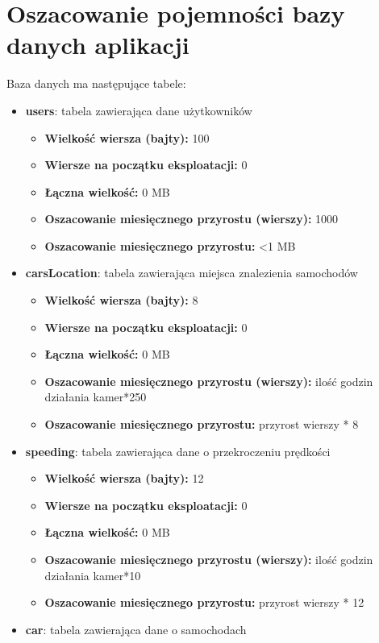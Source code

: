 \documentclass[12pt]{article}
\begin{document}
\section{Oszacowanie pojemności bazy danych aplikacji}
Baza danych ma następujące tabele:
\begin{itemize}
\item \textbf{users}: tabela zawierająca dane użytkowników 
	\begin{itemize}
		\item \textbf{Wielkość wiersza (bajty):} 100
		\item \textbf{Wiersze na początku eksploatacji:} 0
		\item \textbf{Łączna wielkość:} 0 MB
		\item \textbf{Oszacowanie miesięcznego przyrostu (wierszy):} 1000
		\item \textbf{Oszacowanie miesięcznego przyrostu:} <1 MB
	\end{itemize}
\item \textbf{carsLocation}: tabela zawierająca miejsca znalezienia samochodów
	\begin{itemize}
		\item \textbf{Wielkość wiersza (bajty):} 8
		\item \textbf{Wiersze na początku eksploatacji:} 0
		\item \textbf{Łączna wielkość:} 0 MB
		\item \textbf{Oszacowanie miesięcznego przyrostu (wierszy):} ilość godzin działania kamer*250
		\item \textbf{Oszacowanie miesięcznego przyrostu:} przyrost wierszy * 8 
	\end{itemize}
\item \textbf{speeding}: tabela zawierająca dane o przekroczeniu prędkości 
	\begin{itemize}
		\item \textbf{Wielkość wiersza (bajty):} 12
		\item \textbf{Wiersze na początku eksploatacji:} 0
		\item \textbf{Łączna wielkość:} 0 MB
		\item \textbf{Oszacowanie miesięcznego przyrostu (wierszy):} ilość godzin działania kamer*10
		\item \textbf{Oszacowanie miesięcznego przyrostu:} przyrost wierszy * 12 
	\end{itemize}
\item \textbf{car}: tabela zawierająca dane o samochodach
	\begin{itemize}

\end{itemize}
\end{itemize}
\end{document}
